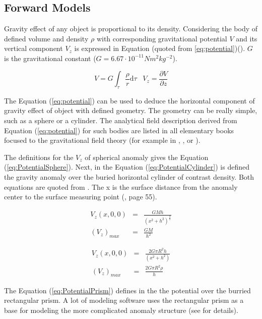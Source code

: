 \documentclass[FM]{tulthesis}
\begin{document}
\subsection{Forward Models} \label{sec:GraviForward}

Gravity effect of any object is proportional to its density. Considering the body of defined volume and density $\rho$ with corresponding gravitational potential $V$ and its vertical component $V_z$ is expressed in Equation (quoted from \ref{eq:potential})(\cite{Mares}). $G$ is the gravitational constant ($G = 6.67\cdot10^{-11}Nm^{2}kg^{-2}$).

\begin{equation} \label{eq:potential}
V = G \int_{\tau} \frac{\rho}{r} \mathrm{d}\tau \; \; \; V_{z}= \frac{\partial V}{\partial z}
\end{equation}

The Equation (\ref{eq:potential}) can be used to deduce the horizontal component of gravity effect of object with defined geometry. The geometry can be really simple, such as a sphere or a cylinder. The analytical field description derived from Equation (\ref{eq:potential}) for such bodies are listed in all elementary books focused to the gravitational field theory (for example in \cite{Mares}, \cite{Blakely}, or \cite{Reynolds}).

The definitions for the $V_{z}$ of spherical anomaly gives the Equation (\ref{eq:PotentialSphere}). Next, in the Equation (\ref{eq:PotentialCylinder}) is defined the gravity anomaly over the buried horizontal cylinder of contrast density. Both equations are quoted from \cite{Mares}. The x is the surface distance from the anomaly center to the surface measuring point (\cite{Mares}, page 55). 

\begin{eqnarray} \label{eq:PotentialSphere}
V_{z}(x,0,0) & = & \frac{GMh}{(x^{2} + h^{2})^{\frac{3}{2}}} \\[2em] 
(V_{z})_{max} & = & \frac{GM}{h^{2}} \nonumber
\end{eqnarray}

\begin{eqnarray} \label{eq:PotentialCylinder}
V_{z}(x,0,0) & = & \frac{2G\pi R^{2}h}{(x^{2} + h^{2})} \\[2em] 
(V_{z})_{max} & = & \frac{2G\pi R^{2}\rho}{h} \nonumber
\end{eqnarray}

The Equation (\ref{eq:PotentialPrism}) defines in the \cite{Blakely} the potential over the burried rectangular prism. A lot of modeling software uses the rectangular prism as a base for modeling the more complicated anomaly structure (see \cite{Blakely} for details). 
\end{document}
